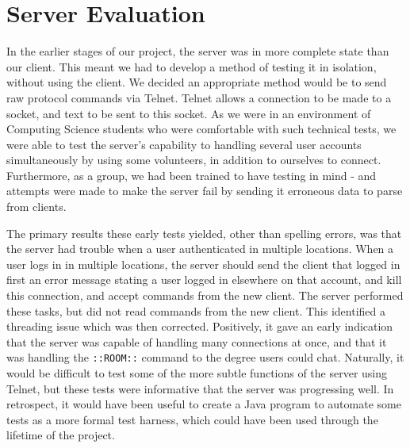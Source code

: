 \section{Server Evaluation}
\label{server_eval}

In the earlier stages of our project, the server was in more complete state than our client. This meant we had to develop a method of testing it in isolation, without using the client. We decided an appropriate method would be to send raw protocol commands via Telnet. Telnet allows a connection to be made to a socket, and text to be sent to this socket. As we were in an environment of Computing Science students who were comfortable with such technical tests, we were able to test the server's capability to handling several user accounts simultaneously by using some volunteers, in addition to ourselves to connect. Furthermore, as a group, we had been trained to have testing in mind - and attempts were made to make the server fail by sending it erroneous data to parse from clients.

The primary results these early tests yielded, other than spelling errors, was that the server had trouble when a user authenticated in multiple locations. When a user logs in in multiple locations, the server should send the client that logged in first an error message stating a user logged in elsewhere on that account, and kill this connection, and accept commands from the new client. The server performed these tasks, but did not read commands from the new client. This identified a threading issue which was then corrected. Positively, it gave an early indication that the server was capable of handling many connections at once, and that it was handling the \texttt{::ROOM::} command to the degree users could chat. Naturally, it would be difficult to test some of the more subtle functions of the server using Telnet, but these tests were informative that the server was progressing well. In retrospect, it would have been useful to create a Java program to automate some tests as a more formal test harness, which could have been used through the lifetime of the project.   
